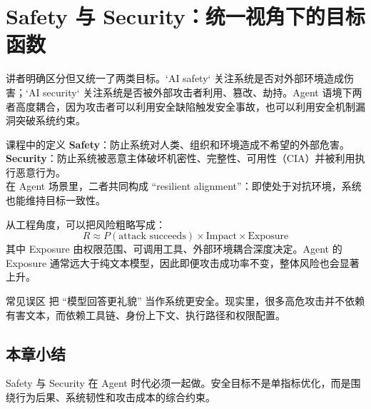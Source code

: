 \section{Safety 与 Security：统一视角下的目标函数}

讲者明确区分但又统一了两类目标。`AI safety` 关注系统是否对外部环境造成伤害；`AI security` 关注系统是否被外部攻击者利用、篡改、劫持。Agent 语境下两者高度耦合，因为攻击者可以利用安全缺陷触发安全事故，也可以利用安全机制漏洞突破系统约束。

\begin{knowledgebox}{课程中的定义}
\textbf{Safety}：防止系统对人类、组织和环境造成不希望的外部危害。\\
\textbf{Security}：防止系统被恶意主体破坏机密性、完整性、可用性（CIA）并被利用执行恶意行为。\\
在 Agent 场景里，二者共同构成 ``resilient alignment''：即使处于对抗环境，系统也能维持目标一致性。
\end{knowledgebox}

从工程角度，可以把风险粗略写成：
$$
R \approx P(\text{attack succeeds}) \times \text{Impact} \times \text{Exposure}
$$
其中 Exposure 由权限范围、可调用工具、外部环境耦合深度决定。Agent 的 Exposure 通常远大于纯文本模型，因此即便攻击成功率不变，整体风险也会显著上升。

\begin{warningbox}{常见误区}
把 ``模型回答更礼貌'' 当作系统更安全。现实里，很多高危攻击并不依赖有害文本，而依赖工具链、身份上下文、执行路径和权限配置。
\end{warningbox}

\subsection{本章小结}
Safety 与 Security 在 Agent 时代必须一起做。安全目标不是单指标优化，而是围绕行为后果、系统韧性和攻击成本的综合约束。

